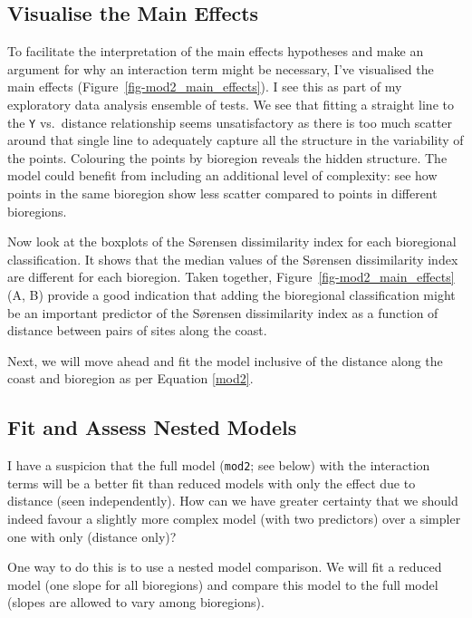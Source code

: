 \documentclass[
  letterpaper,
]{book}
\begin{document}
\subsection{Visualise the Main
Effects}\label{visualise-the-main-effects}

To facilitate the interpretation of the main effects hypotheses and make
an argument for why an interaction term might be necessary, I've
visualised the main effects (Figure~\ref{fig-mod2_main_effects}). I see
this as part of my exploratory data analysis ensemble of tests. We see
that fitting a straight line to the \texttt{Y} vs.~distance relationship
seems unsatisfactory as there is too much scatter around that single
line to adequately capture all the structure in the variability of the
points. Colouring the points by bioregion reveals the hidden structure.
The model could benefit from including an additional level of
complexity: see how points in the same bioregion show less scatter
compared to points in different bioregions.

Now look at the boxplots of the Sørensen dissimilarity index for each
bioregional classification. It shows that the median values of the
Sørensen dissimilarity index are different for each bioregion. Taken
together, Figure~\ref{fig-mod2_main_effects} (A, B) provide a good
indication that adding the bioregional classification might be an
important predictor of the Sørensen dissimilarity index as a function of
distance between pairs of sites along the coast.

Next, we will move ahead and fit the model inclusive of the distance
along the coast and bioregion as per Equation \eqref{mod2}.

\subsection{Fit and Assess Nested
Models}\label{fit-and-assess-nested-models}

I have a suspicion that the full model (\texttt{mod2}; see below) with
the interaction terms will be a better fit than reduced models with only
the effect due to distance (seen independently). How can we have greater
certainty that we should indeed favour a slightly more complex model
(with two predictors) over a simpler one with only (distance only)?

One way to do this is to use a nested model comparison. We will fit a
reduced model (one slope for all bioregions) and compare this model to
the full model (slopes are allowed to vary among bioregions).
\end{document}
